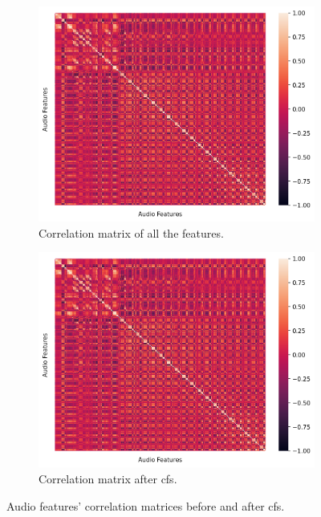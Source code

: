 \begin{figure}
	\begin{subfigure}{.5\textwidth}
		\centering
		\includegraphics[width=\linewidth]{figs/4_1_traditional/allCorrMatrix.png}
		\caption{Correlation matrix of all the features.}
		\label{fig:allAudioFeat}
	\end{subfigure}%
	\begin{subfigure}{.5\textwidth}
		\centering
		\includegraphics[width=\linewidth]{figs/4_1_traditional/highCorrMatrix.png}
		\caption{Correlation matrix after \ac{cfs}.}
		\label{fig:highAudioFeat}
	\end{subfigure}
	\caption{Audio features' correlation matrices before and after \ac{cfs}.}
\end{figure}



